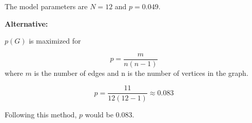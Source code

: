 \begin{enumerate}
The model parameters are $N = 12$ and $p = 0.049$.
	
	
\textbf{Alternative:}

$p(G)$ is maximized for 

\begin{equation}
p = \frac{m}{n(n-1)}
\end{equation}
where $m$ is the number of edges and n is the number of vertices in the graph.

\begin{equation}
p = \frac{11}{12(12-1)} \approx 0.083
\end{equation}

Following this method,  $p$ would be $0.083$.
	
	
	
\end{enumerate}